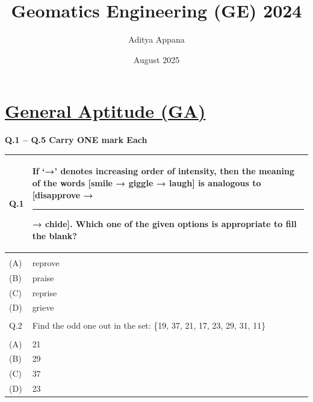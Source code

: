\documentclass[12pt]{article}
\title{Geomatics Engineering (GE) 2024}
\author{Aditya Appana}
\date{August 2025}
\begin{document}
\maketitle

\section*{\underline{General Aptitude (GA)}}

\textbf{Q.1 – Q.5 Carry ONE mark Each}

\vspace{1cm}



\begin{table}[H]
\renewcommand{\arraystretch}{2}
\setlength{\tabcolsep}{8pt}
\begin{tabular}{|l|p{15cm}|}
\hline
Q.1 & If ‘→’ denotes increasing order of intensity, then the meaning of the words [smile → giggle → laugh] is analogous to [disapprove → \rule{1.5cm}{0.15mm} → chide]. Which one of the given options is appropriate to fill the blank? \\ \hline
 & \\ \hline
(A)&reprove \\ \hline
(B)&praise \\ \hline
(C)&reprise \\ \hline
(D)&grieve \\ \hline
 & \\ \hline
Q.2 & Find the odd one out in the set: \{19, 37, 21, 17, 23, 29, 31, 11\}\\ \hline
 & \\ \hline
(A)&21 \\ \hline
(B)&29 \\ \hline
(C)&37 \\ \hline
(D)&23 \\ \hline
 



\end{tabular}
\end{table}
\end{document}
